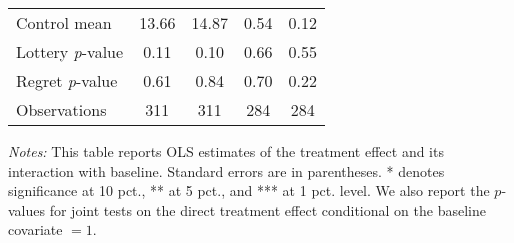 \begin{table}[ht]
{\begin{threeparttable}
\begin{tabular}{l*{4}{c}}
Control mean    &    13.66         &    14.87         &     0.54         &     0.12         \\
Lottery \emph{p}-value&     0.11         &     0.10         &     0.66         &     0.55         \\
Regret \emph{p}-value&     0.61         &     0.84         &     0.70         &     0.22         \\
Observations    &      311         &      311         &      284         &      284         \\
\bottomrule \end{tabular} \begin{tablenotes}[flushleft] \footnotesize \item \emph{Notes:} This table reports OLS estimates of the treatment effect and its interaction with baseline. Standard errors are in parentheses. * denotes significance at 10 pct., ** at 5 pct., and *** at 1 pct. level. We also report the \(p\)-values for joint tests on the direct treatment effect conditional on the baseline covariate $= 1$. \end{tablenotes} \end{threeparttable} } \end{table}

